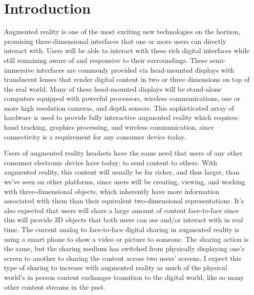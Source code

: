 \documentclass[12pt]{report}
\begin{document}


\tableofcontents
\pagebreak

\listoffigures
\pagebreak

\listoftables
\pagebreak

\pagestyle{myheadings}


\chapter{Introduction}
Augmented reality is one of the most exciting new technologies on the horizon, promising three-dimensional interfaces that one or more users can directly interact with. Users will be able to interact with these rich digital interfaces while still remaining aware of and responsive to their surroundings. These semi-immersive interfaces are commonly provided via head-mounted displays with translucent lenses that render digital content in two or three dimensions on top of the real world. Many of these head-mounted displays will be stand-alone computers equipped with powerful processors, wireless communications, one or more high resolution cameras, and depth sensors. This sophisticated array of hardware is used to provide fully interactive augmented reality which requires: hand tracking, graphics processing, and wireless communication, since connectivity is a requirement for any consumer device today. \par

Users of augmented reality headsets have the same need that users of any other consumer electronic device have today: to send content to others. With augmented reality, this content will usually be far richer, and thus larger, than we've seen on other platforms, since users will be creating, viewing, and working with three-dimensional objects, which inherently have more information associated with them than their equivalent two-dimensional representations. It's also expected that users will share a large amount of content face-to-face since this will provide 3D objects that both users can see and/or interact with in real time. The current analog to face-to-face digital sharing in augmented reality is using a smart phone to show a video or picture to someone. The sharing action is the same, but the sharing medium has switched from physically displaying one's screen to another to sharing the content across two users' screens. I expect this type of sharing to increase with augmented reality as much of the physical world's in person content exchanges transition to the digital world, like so many other content streams in the past. \par
\end{document}
